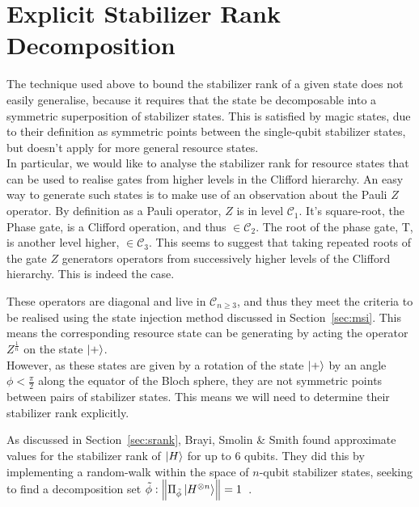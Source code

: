 \documentclass{standalone}
\begin{document}
\section{Explicit Stabilizer Rank Decomposition}\label{sec:decompositions}
The technique used above to bound the stabilizer rank of a given state does not easily generalise, because it requires that the state be decomposable into a symmetric superposition of stabilizer states. This is satisfied by magic states, due to their definition as symmetric points between the single-qubit stabilizer states, but doesn't apply for more general resource states. \\
In particular, we would like to analyse the stabilizer rank for resource states that can be used to realise gates from higher levels in the Clifford hierarchy. An easy way to generate such states is to make use of an observation about the Pauli $Z$ operator. By definition as a Pauli operator, $Z$ is in level $\mathcal{C}_{1}$. It's square-root, the Phase gate, is a Clifford operation, and thus $\in\mathcal{C}_{2}$. The root of the phase gate, T, is another level higher, $\in\mathcal{C}_{3}$. This seems to suggest that taking repeated roots of the gate $Z$ generators operators from successively higher levels of the Clifford hierarchy. This is indeed the case.
\par
These operators are diagonal and live in $\mathcal{C}_{n\geq3}$, and thus they meet the criteria to be realised using the state injection method discussed in Section~\ref{sec:msi}. This means the corresponding resource state can be generating by acting the operator $Z^{\frac{1}{n}}$ on the state $\ket{+}$. \\
However, as these states are given by a rotation of the state $\ket{+}$ by an angle $\phi<\frac{\pi}{2}$ along the equator of the Bloch sphere, they are not symmetric points between pairs of stabilizer states. This means we will need to determine their stabilizer rank explicitly. 
\par
As discussed in Section~\ref{sec:srank}, Brayi, Smolin \& Smith found approximate values for the stabilizer rank of $\ket{H}$ for up to $6$ qubits. They did this by implementing a random-walk within the space of $n$-qubit stabilizer states, seeking to find a decomposition set $\tilde{\phi}:\norm{\Pi_{\tilde{\phi}}\ket{H^{\otimes n}}}=1$~\cite{Bravyi2015}. \par
\end{document}
